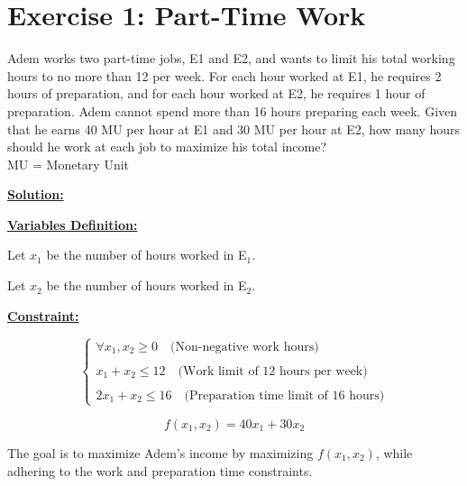 \section*{Exercise 1: Part-Time Work}
Adem works two part-time jobs, E1 and E2, and wants to limit his total working hours to no more than 12 per week. For each hour worked
at E1, he requires 2 hours of preparation, and for each hour worked at E2, he requires 1 hour of preparation. Adem cannot spend
more than 16 hours preparing each week. Given that he earns 40 MU per hour at E1 and 30 MU per hour at E2, how many hours should
he work at each job to maximize his total income?\\
MU = Monetary Unit

\vspace{1.5cm}
\textbf{\underline{\Large Solution:}}
\begin{multicols}{2}
\textbf{\underline{Variables Definition:}}

Let \(x_1\) be the number of hours worked in E$_{1}$.

Let \(x_2\) be the number of hours worked in E$_{2}$.
\columnbreak

\textbf{\underline{Constraint:}} 

\[
\left\{
    \begin{array}{l}
       \forall x_1, x_2 \geq 0 \quad \text{(Non-negative work hours)}\\\\
        x_1 + x_2 \leq 12 \quad \text{(Work limit of 12 hours per week)}\\\\
        2x_1 + x_2 \leq 16 \quad \text{(Preparation time limit of 16 hours)}
   \end{array}
   \right.
\] 
\end{multicols}
\vspace{0.5cm}
\begin{tcolorbox}[title = Objectif Function]
\[
f(x_1,x_2) = 40x_1 + 30x_2 
\]
\begin{center}
The goal is to maximize Adem's income by maximizing \(f(x_1,x_2)\), while adhering to the work and preparation time constraints.
\end{center}
\end{tcolorbox}

